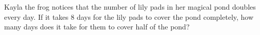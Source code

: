 Kayla the frog notices that the number of lily pads in her magical pond doubles every day. If it takes $8$ days for the lily pads to cover the pond completely, how many days does it take for them to cover half of the pond?
